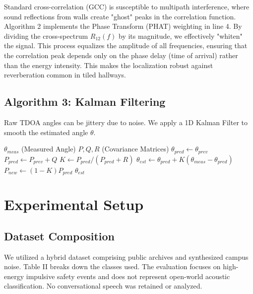 \documentclass[conference]{IEEEtran}
\begin{document}
Standard cross-correlation (GCC) is susceptible to multipath interference, where sound reflections from walls create "ghost" peaks in the correlation function. Algorithm 2 implements the Phase Transform (PHAT) weighting in line 4. By dividing the cross-spectrum $R_{12}(f)$ by its magnitude, we effectively "whiten" the signal. This process equalizes the amplitude of all frequencies, ensuring that the correlation peak depends only on the phase delay (time of arrival) rather than the energy intensity. This makes the localization robust against reverberation common in tiled hallways.

\subsection{Algorithm 3: Kalman Filtering}
Raw TDOA angles can be jittery due to noise. We apply a 1D Kalman Filter to smooth the estimated angle $\theta$.

\begin{algorithm}
\caption{Kalman Angle Smoothing}
\begin{algorithmic}[1]
\REQUIRE $\theta_{meas}$ (Measured Angle)
\REQUIRE $P, Q, R$ (Covariance Matrices)
\STATE $ \theta_{pred} \gets \theta_{prev} $ 
\STATE $ P_{pred} \gets P_{prev} + Q $
\STATE $ K \gets P_{pred} / (P_{pred} + R) $ 
\STATE $ \theta_{est} \gets \theta_{pred} + K(\theta_{meas} - \theta_{pred}) $ 
\STATE $ P_{new} \gets (1 - K)P_{pred} $
\RETURN $\theta_{est}$
\end{algorithmic}
\label{alg:kalman}
\end{algorithm}

\section{Experimental Setup}

\subsection{Dataset Composition}
We utilized a hybrid dataset comprising public archives and synthesized campus noise. Table II breaks down the classes used. The evaluation focuses on high-energy impulsive safety events and does not represent open-world acoustic classification. No conversational speech was retained or analyzed.
\end{document}
